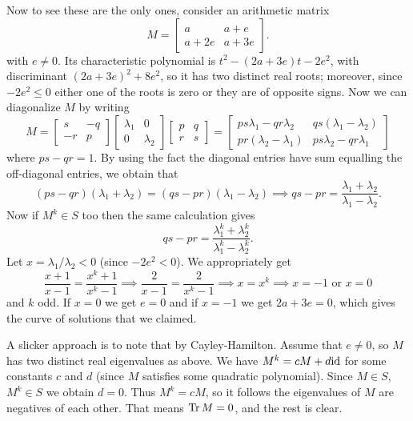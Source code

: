\begin{problem}
\begin{sol}
		Now to see these are the only ones, consider an arithmetic matrix
		\[ M = \begin{bmatrix} a & a+e \\ a+2e & a+3e \end{bmatrix}. \]
		with $e \neq 0$.
		Its characteristic polynomial is $t^2 - (2a+3e)t - 2e^2$,
		with discriminant $(2a+3e)^2 + 8e^2$,
		so it has two distinct real roots; moreover, since $-2e^2 \le 0$
		either one of the roots is zero or they are of opposite signs.
		Now we can diagonalize $M$ by writing
		\[
			M =
			\begin{bmatrix} s & -q \\ -r & p \end{bmatrix}
			\begin{bmatrix} \lambda_1 & 0 \\ 0 & \lambda_2 \end{bmatrix}
			\begin{bmatrix} p & q \\ r & s \end{bmatrix}
			=
			\begin{bmatrix} 
				ps\lambda_1 - qr\lambda_2 & qs(\lambda_1-\lambda_2) \\
				pr(\lambda_2-\lambda_1) & ps\lambda_2 - qr\lambda_1
			\end{bmatrix} 
		\]
		where $ps-qr=1$. By using the fact the diagonal entries have sum equalling
		the off-diagonal entries, we obtain that
		\[ (ps-qr)(\lambda_1+\lambda_2) = (qs-pr)(\lambda_1-\lambda_2) 
			\implies qs-pr = \frac{\lambda_1+\lambda_2}{\lambda_1-\lambda_2}. \]
		Now if $M^k \in S$ too then the same calculation gives
		\[ qs-pr = \frac{\lambda_1^k+\lambda_2^k}{\lambda_1^k-\lambda_2^k}. \]
		Let $x = \lambda_1/\lambda_2 < 0$ (since $-2e^2 < 0$). We appropriately get
		\[ \frac{x+1}{x-1} = \frac{x^k+1}{x^k-1}
			\implies \frac{2}{x-1} = \frac{2}{x^k-1}
			\implies x = x^k \implies x = -1 \text{ or } x = 0 \]
		and $k$ odd. If $x=0$ we get $e=0$ and if $x=-1$ we get $2a+3e=0$,
		which gives the curve of solutions that we claimed.

		A slicker approach is to note that by Cayley-Hamilton.
		Assume that $e \neq 0$, so $M$ has two distinct real eigenvalues as above.
		We have $M^k = cM + d\mathrm{id}$ for some constants $c$ and $d$
		(since $M$ satisfies some quadratic polynomial).
		Since $M \in S$, $M^k \in S$ we obtain $d=0$.
		Thus $M^k = cM$, so it follows the eigenvalues of $M$ are negatives of each other.
		That means $\operatorname{Tr} M = 0$, and the rest is clear.
	\end{sol}
\end{problem}

